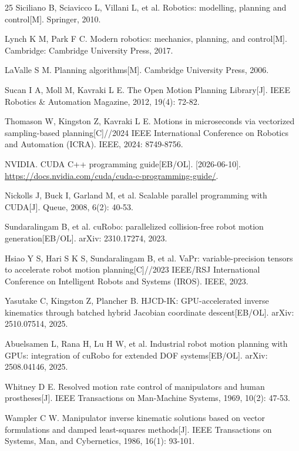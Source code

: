 \documentclass[twocolumn,a4paper,10pt]{ctexart}
\begin{document}
\FloatBarrier
\begin{thebibliography}{25}
Siciliano B, Sciavicco L, Villani L, et al. Robotics: modelling, planning and control[M]. Springer, 2010.

Lynch K M, Park F C. Modern robotics: mechanics, planning, and control[M]. Cambridge: Cambridge University Press, 2017.

LaValle S M. Planning algorithms[M]. Cambridge University Press, 2006.

Sucan I A, Moll M, Kavraki L E. The Open Motion Planning Library[J]. IEEE Robotics \& Automation Magazine, 2012, 19(4): 72-82.

Thomason W, Kingston Z, Kavraki L E. Motions in microseconds via vectorized sampling-based planning[C]//2024 IEEE International Conference on Robotics and Automation (ICRA). IEEE, 2024: 8749-8756.

NVIDIA. CUDA C++ programming guide[EB/OL]. [2026-06-10]. \url{https://docs.nvidia.com/cuda/cuda-c-programming-guide/}.

Nickolls J, Buck I, Garland M, et al. Scalable parallel programming with CUDA[J]. Queue, 2008, 6(2): 40-53.

Sundaralingam B, et al. cuRobo: parallelized collision-free robot motion generation[EB/OL]. arXiv: 2310.17274, 2023.

Hsiao Y S, Hari S K S, Sundaralingam B, et al. VaPr: variable-precision tensors to accelerate robot motion planning[C]//2023 IEEE/RSJ International Conference on Intelligent Robots and Systems (IROS). IEEE, 2023.

Yasutake C, Kingston Z, Plancher B. HJCD-IK: GPU-accelerated inverse kinematics through batched hybrid Jacobian coordinate descent[EB/OL]. arXiv: 2510.07514, 2025.

Abuelsamen L, Rana H, Lu H W, et al. Industrial robot motion planning with GPUs: integration of cuRobo for extended DOF systems[EB/OL]. arXiv: 2508.04146, 2025.

Whitney D E. Resolved motion rate control of manipulators and human prostheses[J]. IEEE Transactions on Man-Machine Systems, 1969, 10(2): 47-53.

Wampler C W. Manipulator inverse kinematic solutions based on vector formulations and damped least-squares methods[J]. IEEE Transactions on Systems, Man, and Cybernetics, 1986, 16(1): 93-101.


\end{thebibliography}
\end{document}
